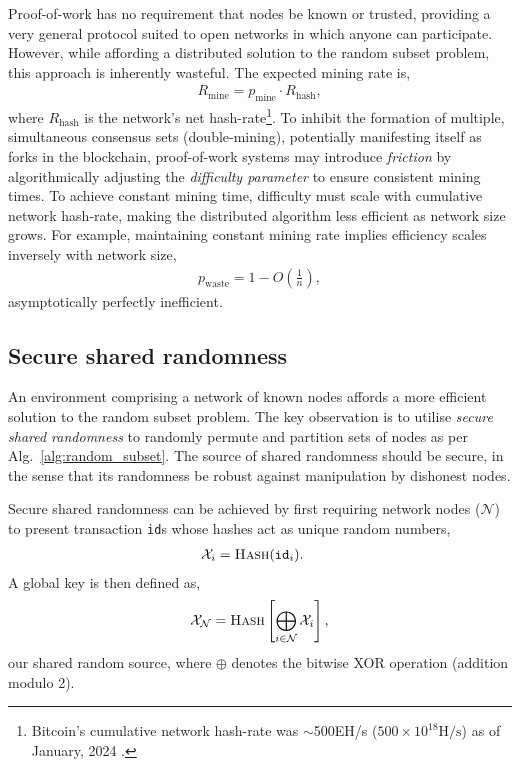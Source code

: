 \documentclass[twocolumn, aps, amsmath, amssymb, nofootinbib, superscriptaddress, longbibliography, floatfix, eqsecnum, rmp]{revtex4-2}
\begin{document}
Proof-of-work has no requirement that nodes be known or trusted, providing a very general protocol suited to open networks in which anyone can participate. However, while affording a distributed solution to the random subset problem, this approach is inherently wasteful. The expected mining rate is,
\begin{align}
	R_\mathrm{mine} = p_\mathrm{mine}\cdot R_\mathrm{hash},
\end{align}
where $R_\mathrm{hash}$ is the network's net hash-rate\footnote{Bitcoin's cumulative network hash-rate was $\sim$500EH/s \mbox{($500\times 10^{18}\mathrm{H/s}$)} as of January, 2024 \cite{hash_rate}.}. To inhibit the formation of multiple, simultaneous consensus sets (double-mining), potentially manifesting itself as forks in the blockchain, proof-of-work systems may introduce \emph{friction} by algorithmically adjusting the \emph{difficulty parameter} to ensure consistent mining times. To achieve constant mining time, difficulty must scale with cumulative network hash-rate, making the distributed algorithm less efficient as network size grows. For example, maintaining constant mining rate implies efficiency scales inversely with network size,
\begin{align}
	p_\mathrm{waste}=1-O\left(\frac{1}{n}\right),
\end{align}
asymptotically perfectly inefficient.

\subsection{Secure shared randomness} \label{sec:secure_shared_randomness}

An environment comprising a network of known nodes affords a more efficient solution to the random subset problem. The key observation is to utilise  \emph{secure shared randomness} to randomly permute and partition sets of nodes as per Alg.~\ref{alg:random_subset}. The source of shared randomness should be secure, in the sense that its randomness be robust against manipulation by dishonest nodes.

Secure shared randomness can be achieved by first requiring network nodes ($\mathcal{N}$) to present transaction \texttt{id}s whose hashes act as unique random numbers,
\begin{align}
\mathcal{X}_i &= \textsc{Hash}(\mathtt{id}_i).\end{align}
A global key is then defined as,
\begin{align} \label{eq:global_K}
	\mathcal{X}_\mathcal{N} = \textsc{Hash}\left[\bigoplus_{i\in \mathcal{N}} \mathcal{X}_i\right],
\end{align}
our shared random source, where $\oplus$ denotes the bitwise XOR operation (addition modulo 2).
\end{document}
